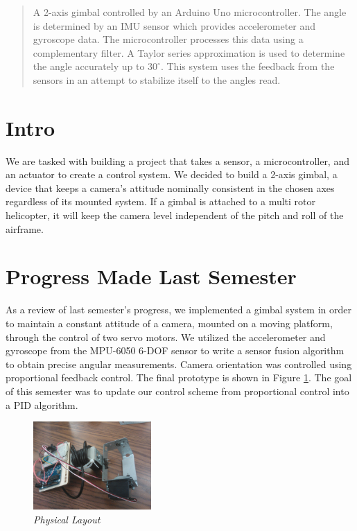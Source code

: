 \documentclass{IEEEtran}
\begin{document}

\vfill

\begin{abstract}
A 2-axis gimbal controlled by an Arduino Uno microcontroller. The angle is determined by an IMU sensor which provides accelerometer and gyroscope data. The microcontroller processes this data using a complementary filter. A Taylor series approximation is used to determine the angle accurately up to $30^\circ$. This system uses the feedback from the sensors in an attempt to stabilize itself to the angles read.
\end{abstract}

\section{Intro}
We are tasked with building a project that takes a sensor, a microcontroller, and an actuator to create a control system. We decided to build a 2-axis gimbal, a device that keeps a camera's attitude nominally consistent in the chosen axes regardless of its mounted system. If a gimbal is attached to a multi rotor helicopter, it will keep the camera level independent of the pitch and roll of the airframe.

\section{Progress Made Last Semester}
As a review of last semester's progress, we implemented a gimbal system in order to maintain a constant attitude of a camera, mounted on a moving platform, through the control of two servo motors. We utilized the accelerometer and gyroscope from the MPU-6050 6-DOF sensor to write a sensor fusion algorithm to obtain precise angular measurements. Camera orientation was controlled using proportional feedback control. The final prototype is shown in Figure \ref{physicalPIC}. The goal of this semester was to update our control scheme from proportional control into a PID algorithm.

\begin{figure}[ht!]
    \centering
    \includegraphics[width=0.4\textwidth]{../physical}
    \caption{\emph{Physical Layout}}
    \label{physicalPIC}
\end{figure}
\end{document}
